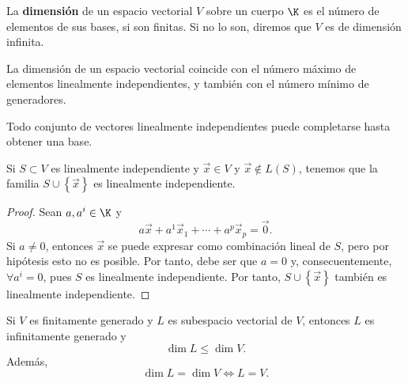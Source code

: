 \begin{fdefinition}[Dimensión]
\normalfont La \textbf{dimensión} de un espacio vectorial $\displaystyle V $ sobre un cuerpo $\displaystyle \K $ es el número de elementos de sus bases, si son finitas. Si no lo son, diremos que $\displaystyle V $ es de dimensión infinita.
\end{fdefinition}

\begin{fcolorary}[]
\normalfont La dimensión de un espacio vectorial coincide con el número máximo de elementos linealmente independientes, y también con el número mínimo de generadores.
\end{fcolorary}

\begin{fcolorary}[]
\normalfont Todo conjunto de vectores linealmente independientes puede completarse hasta obtener una base.
\end{fcolorary}

\begin{flema}[]
	\normalfont Si $S \subset V$ es linealmente independiente y $\displaystyle \vec{x} \in V $ y $\displaystyle \vec{x} \not\in L\left(S\right) $, tenemos que la familia $\displaystyle S \cup \left\{ \vec{x}\right\}   $ es linealmente independiente. 
\end{flema}

\begin{proof}
Sean $\displaystyle a,a^{i} \in \K $ y 
\[a\vec{x} + a^{1}\vec{x}_{1} + \cdots + a^{p}\vec{x}_{p} = \vec{0} .\]
Si $\displaystyle a \neq 0 $, entonces $\displaystyle \vec{x} $ se puede expresar como combinación lineal de $\displaystyle S $, pero por hipótesis esto no es posible. Por tanto, debe ser que $\displaystyle a = 0 $ y, consecuentemente, $\displaystyle \forall a^{i} = 0 $, pues $\displaystyle S $ es linealmente independiente. Por tanto, $\displaystyle S \cup \left\{ \vec{x}\right\}  $ también es linealmente independiente.
\end{proof}

\begin{fprop}[]
\normalfont Si $\displaystyle V $ es finitamente generado y $\displaystyle L $ es subespacio vectorial de $\displaystyle V $, entonces $\displaystyle L $ es infinitamente generado y 
\[\dim L \leq \dim V .\]
Además, 
\[\dim L = \dim V \iff L = V .\]
\end{fprop}

